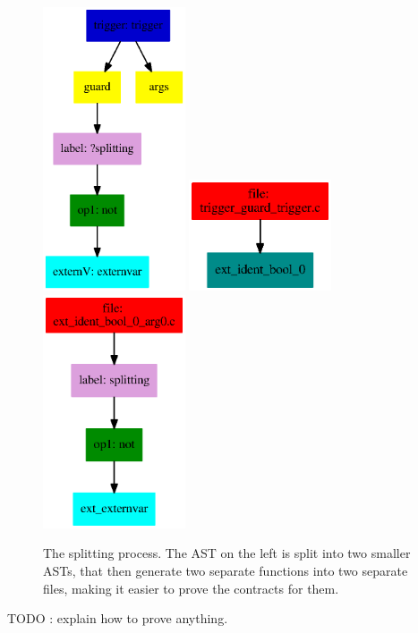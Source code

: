 \begin{figure}[!htb]
	\vspace*{2cm}
	\includegraphics[width=42mm]{images/label/main.ps}
	\includegraphics[width=42mm]{images/label/splitted.ps}
	\includegraphics[width=42mm]{images/label/splitted2.ps}
	\caption{The splitting process. The AST on the left is split into two smaller ASTs, that then generate two separate functions into two separate files, making it easier to prove the contracts for them.}
	\label{fig:splitting label}
\end{figure}


TODO : explain how to prove anything.